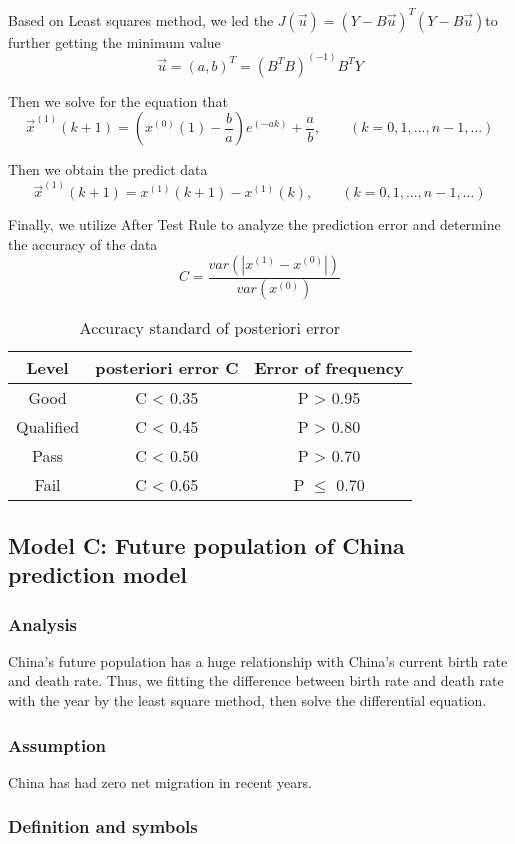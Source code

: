\documentclass{mcmthesis}
\begin{document}
Based on Least squares method, we led the $J(\vec u)=(Y-B\vec u)^T (Y-B\vec u)$to further getting the minimum value
$$\vec u = (a,b)^{T} = (B^TB)^{(-1)}B^TY$$

Then we solve for the equation that
$$\vec x^{(1)}(k+1) = (x^{(0)}(1) - \frac{b}{a})e^{(-ak)} + \frac{a}{b}, \qquad(k=0, 1, ..., n-1, ...)$$

Then we obtain the predict data
$$\vec x^{(1)}(k+1) = x^{(1)}(k+1) - x^{(1)}(k), \qquad(k=0, 1, ..., n-1, ...)$$


Finally, we utilize After Test Rule to analyze the prediction error and determine the accuracy of the data
$$C = \frac{var(|x^{(1)} - x^{(0)}|)}{var(x^{(0)})}$$
\begin{table}[!ht]
  \centering
  \begin{tabular}{ c | c | c }
    \hline
    Level & posteriori error  C & Error of frequency \\ \hline
    Good & C < 0.35 & P > 0.95 \\ \hline
    Qualified & C < 0.45 & P > 0.80\\  \hline
    Pass &  C < 0.50 & P > 0.70\\  \hline
    Fail &  C < 0.65 & P $\le$ 0.70\\  \hline
  \end{tabular}
  \caption{Accuracy standard of posteriori error \cite{6}}
  \label{error}
\end{table}

\subsection{Model C: Future population of China prediction model}
\subsubsection{Analysis}
China's future population has a huge relationship with China's current birth rate and death rate. Thus, we fitting the difference between birth rate and death rate with the year by the least square method, then solve the differential equation.

\subsubsection{Assumption}
China has had zero net migration in recent years.

\subsubsection{Definition and symbols}
\end{document}
